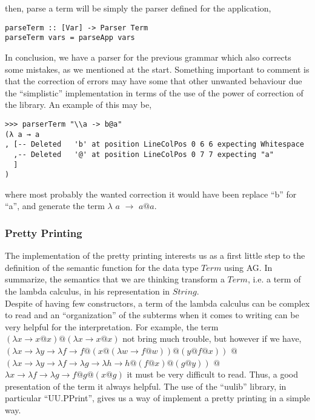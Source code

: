 \documentclass[a4paper,10pt]{article}
\begin{document}
then, parse a term will be simply the parser defined for the application,

\begin{lstlisting}
parseTerm :: [Var] -> Parser Term
parseTerm vars = parseApp vars
\end{lstlisting}

In conclusion, we have a parser for the previous grammar which also corrects some
mistakes, as we mentioned at the start. Something important to comment is that the
correction of errors may have some that other unwanted behaviour due the ``simplistic''
implementation in terms of the use of the power of correction of the library. An
example of this may be,

\begin{verbatim}
>>> parserTerm "\\a -> b@a"
(λ a → a
, [-- Deleted   'b' at position LineColPos 0 6 6 expecting Whitespace
  ,-- Deleted   '@' at position LineColPos 0 7 7 expecting "a"
  ]
)
\end{verbatim}

where most probably the wanted correction it would have been replace ``b'' for
``a'', and generate the term $\lambda$ $a$ $\rightarrow$ $a@a$.

\subsubsection{Pretty Printing}

The implementation of the pretty printing interests us as a first little step to
the definition of the semantic function for the data type $Term$ using AG. In
summarize, the semantics that we are thinking transform a $Term$, i.e. a term
of the lambda calculus, in his representation in $String$.\\

Despite of having few constructors, a term of the lambda calculus can be complex
to read and an ``organization'' of the subterms when it comes to writing can be
very helpful for the interpretation. For example, the term 
$(\lambda x \rightarrow x@x)@(\lambda x \rightarrow x@x)$
not bring much trouble, but however if we have,
$(\lambda x \rightarrow
	\lambda y \rightarrow
		\lambda f \rightarrow f @ (x @ (\lambda w \rightarrow f @ w)) @ (y @ f @ x))$
$@$
$(\lambda x \rightarrow 
	\lambda y \rightarrow \lambda f \rightarrow 
	\lambda g \rightarrow \lambda h \rightarrow h @ (f @ x) @ (g @ y))$
$@$ $\lambda x \rightarrow \lambda f \rightarrow 
		\lambda g \rightarrow f @ g @ (x @ g)$
it must be very difficult to read. Thus, a good presentation of the term it always
helpful. The use of the ``uulib'' library, in particular ``UU.PPrint'', gives us
a way of implement a pretty printing in a simple way.\\
\end{document}
